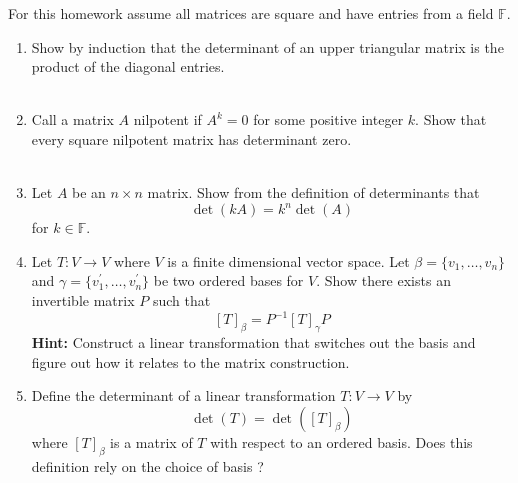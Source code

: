 \documentclass[12pt,letterpaper]{article}
\theoremstyle{plain}
\theoremstyle{definition}
\begin{document}
\noindent For this homework assume all matrices are square and have entries from a field $\mathbb{F}$. 
\begin{enumerate}[1.]

\item Show by induction that the determinant of an upper triangular matrix is the product of the diagonal entries. \\
\ \\
\item Call a matrix $A$ nilpotent if $A^k=0$ for some positive integer $k$. Show that every square nilpotent matrix has determinant zero. \\
\ \\
\item Let $A$ be an $n\times n$ matrix. Show from the definition of determinants that \[\det(kA)=k^n \det(A)\] for $k\in \mathbb{F}$.

\item Let $T:V\rightarrow V$ where $V$ is a finite dimensional vector space. Let $\beta=\{v_1, \ldots, v_n\}$ and $\gamma=\{v_1^\prime, \ldots, v_n^\prime\}$ be two ordered bases for $V$. Show there exists an invertible matrix $P$ such that 
\[[T]_\beta=P^{-1}[T]_\gamma P\]
{\bf Hint:} Construct a linear transformation that switches out the basis and figure out how it relates to the matrix construction. 

\item Define the determinant of a linear transformation $T:V\rightarrow V$ by 
\[\det(T)=\det([T]_\beta)\]
where $[T]_\beta$ is a matrix of $T$ with respect to an ordered basis. Does this definition rely on the choice of basis ?


\end{enumerate}
\end{document}
